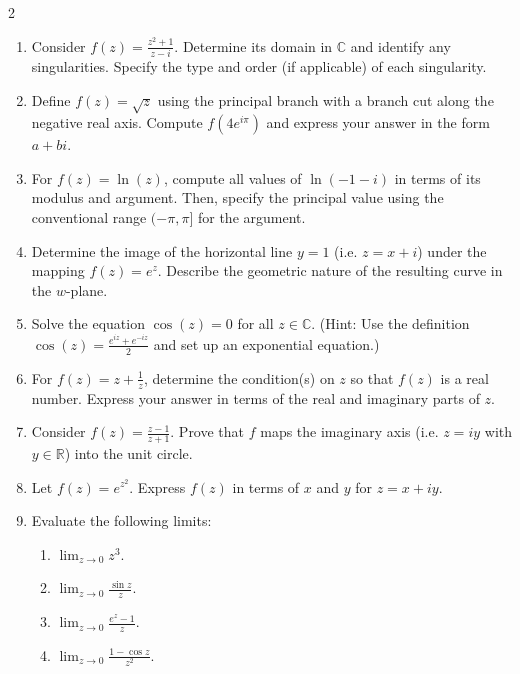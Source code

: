 \begin{multicols}{2}
\begin{enumerate}
\item 
Consider \( f(z)=\frac{z^2+1}{z-i} \). Determine its domain in \( \mathbb{C} \) and identify any singularities. Specify the type and order (if applicable) of each singularity.

\item 
Define \( f(z)=\sqrt{z} \) using the principal branch with a branch cut along the negative real axis. Compute \( f(4e^{i\pi}) \) and express your answer in the form \( a+bi \).

\item 
For \( f(z)=\ln(z) \), compute all values of \( \ln(-1-i) \) in terms of its modulus and argument. Then, specify the principal value using the conventional range \( (-\pi,\pi] \) for the argument.

\item 
Determine the image of the horizontal line \( y=1 \) (i.e. \( z=x+i \)) under the mapping \( f(z)=e^z \). Describe the geometric nature of the resulting curve in the \( w \)-plane.

\item 
Solve the equation \( \cos(z)=0 \) for all \( z\in\mathbb{C} \). (Hint: Use the definition \( \cos(z)=\frac{e^{iz}+e^{-iz}}{2} \) and set up an exponential equation.)

\item 
For \( f(z)=z+\frac{1}{z} \), determine the condition(s) on \( z \) so that \( f(z) \) is a real number. Express your answer in terms of the real and imaginary parts of \( z \).

\item 
Consider \( f(z)=\frac{z-1}{z+1} \). Prove that \( f \) maps the imaginary axis (i.e. \( z=iy \) with \( y\in\mathbb{R} \)) into the unit circle.

\item 
Let \( f(z)=e^{z^2} \). Express \( f(z) \) in terms of \( x \) and \( y \) for \( z=x+iy \).

  \item Evaluate the following limits:
    \begin{enumerate}
      \item \( \displaystyle \lim_{z \to 0} z^3 \).
      \item \( \displaystyle \lim_{z \to 0} \frac{\sin z}{z} \).
      \item \( \displaystyle \lim_{z \to 0} \frac{e^z - 1}{z} \).
      \item \( \displaystyle \lim_{z \to 0} \frac{1 - \cos z}{z^2} \).
    \end{enumerate}


\end{enumerate}
\end{multicols}
